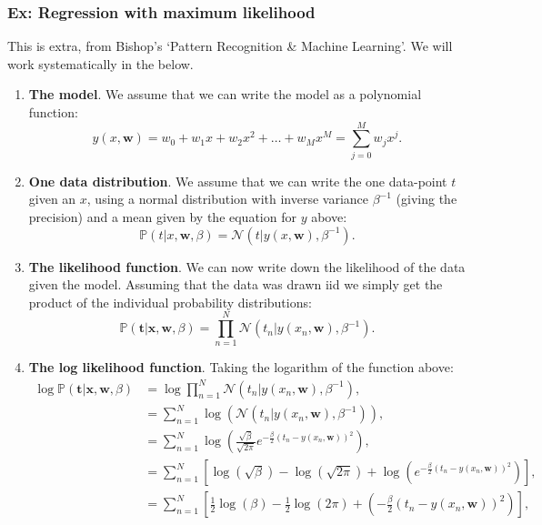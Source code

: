 \documentclass{article}
\begin{document}
\subsubsection{Ex: Regression with maximum likelihood}
This is extra, from Bishop's `Pattern Recognition \& Machine Learning'. We will work systematically in the below.
\begin{enumerate}
    \item \textbf{The model}. We assume that we can write the model as a polynomial function:
    \begin{equation}
        y(x,\mathbf{w}) = w_0+w_1x+w_2x^2+\dots+w_Mx^M=\sum_{j=0}^M w_jx^j.
    \end{equation}
    \item \textbf{One data distribution}. We assume that we can write the one data-point $t$ given an $x$, using a normal distribution with inverse variance $\beta^{-1}$ (giving the precision) and a mean given by the equation for $y$ above:
    \begin{equation}
        \mathbb{P}(t|x,\mathbf{w},\beta) = \mathcal{N}(t|y(x,\mathbf{w}),\beta^{-1}).
    \end{equation}
    \item \textbf{The likelihood function}. We can now write down the likelihood of the data given the model. Assuming that the data was drawn iid we simply get the product of the individual probability distributions:
    \begin{equation}
        \mathbb{P}(\mathbf{t}|\mathbf{x},\mathbf{w},\beta) = \prod_{n=1}^N \mathcal{N}(t_n|y(x_n,\mathbf{w}),\beta^{-1}).
    \end{equation}
    \item \textbf{The log likelihood function}. Taking the logarithm of the function above:
    \begin{align}
        \log \mathbb{P}(\mathbf{t}|\mathbf{x},\mathbf{w},\beta) & = \log \prod_{n=1}^N \mathcal{N}(t_n|y(x_n,\mathbf{w}),\beta^{-1}),\\
        & = \sum_{n=1}^N\log\left(\mathcal{N}(t_n|y(x_n,\mathbf{w}),\beta^{-1})\right),\\
        &=\sum_{n=1}^N\log\left( \frac{\sqrt{\beta}}{\sqrt{2\pi}} e^{-\frac{\beta}{2}(t_n-y(x_n,\mathbf{w}))^2 }         \right), \\
        &=\sum_{n=1}^N\left[\log\left( \sqrt{\beta} \right) - \log \left(\sqrt{2\pi} \right) + \log \left( e^{-\frac{\beta}{2}(t_n-y(x_n,\mathbf{w}))^2 }         \right)\right],\\
        &=\sum_{n=1}^N\left[\frac{1}{2}\log\left(\beta\right) - \frac{1}{2}\log \left(2\pi\right) + \left( -\frac{\beta}{2}(t_n-y(x_n,\mathbf{w}))^2          \right)\right],\\

\end{align}
\end{enumerate}
\end{document}
